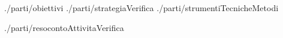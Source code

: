 \documentclass[a4paper,12pt]{article}
\title{\titoloDoc}
\newcommand{\parti}{./parti/}
\newcommand{\temp}{../../Template/}
\begin{document}
	\newpage
	\newpage
	\tableofcontents %
	\newpage
	\listoffigures
	\listoftables
	\newpage
	\newpage
	
	\newpage
	 {\parti obiettivi}
	\newpage
	 {\parti strategiaVerifica}
	\newpage
	 {\parti strumentiTecnicheMetodi}
	
	\begin{appendices}
		\newpage
		 {\parti resocontoAttivitaVerifica}
		\newpage
		
	\end{appendices}
\end{document}
